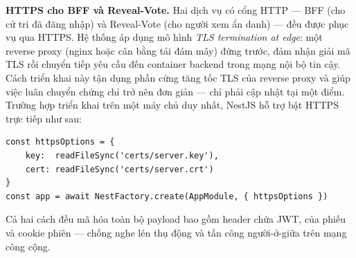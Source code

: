\textbf{HTTPS cho BFF và Reveal-Vote.} Hai dịch vụ có cổng HTTP — BFF (cho cử tri đã đăng nhập) và Reveal-Vote (cho người xem ẩn danh) — đều được phục vụ qua HTTPS. Hệ thống áp dụng mô hình \textit{TLS termination at edge}: một reverse proxy (nginx hoặc cân bằng tải đám mây) đứng trước, đảm nhận giải mã TLS rồi chuyển tiếp yêu cầu  đến container backend trong mạng nội bộ tin cậy. Cách triển khai này tận dụng phần cứng tăng tốc TLS của reverse proxy và giúp việc luân chuyển chứng chỉ trở nên đơn giản — chỉ phải cập nhật tại một điểm. Trường hợp triển khai trên một máy chủ duy nhất, NestJS hỗ trợ bật HTTPS trực tiếp như sau:

\begin{verbatim}
const httpsOptions = {
    key:  readFileSync('certs/server.key'),
    cert: readFileSync('certs/server.crt')
}
const app = await NestFactory.create(AppModule, { httpsOptions })
\end{verbatim}

Cả hai cách đều mã hóa toàn bộ payload bao gồm  header chứa JWT,  của phiếu và cookie phiên — chống nghe lén thụ động và tấn công người-ở-giữa trên mạng công cộng.

